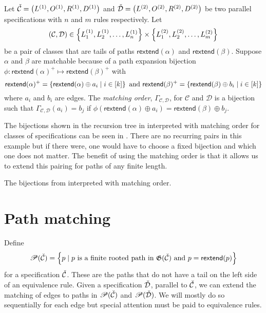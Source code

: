 \begin{definition}
Let $\check{\mathcal{C}} = \left(L^{(1)}, O^{(1)}, R^{(1)}, D^{(1)}\right)$ and $\check{\mathcal{D}} = \left(L^{(2)}, O^{(2)}, R^{(2)}, D^{(2)}\right)$ be two parallel specifications with $n$ and $m$ rules respectively. Let
\[
    \left(\mathcal{C},\mathcal{D}\right) \in \left\{L^{(1)}_1,L^{(1)}_2,\dotsc,L^{(1)}_n\right\} \times \left\{L^{(2)}_1, L^{(2)}_2, \dotsc, L^{(2)}_m\right\}
\]
be a pair of classes that are tails of paths $\textsf{rextend}(\alpha)$ and $\textsf{rextend}(\beta)$. Suppose $\alpha$ and $\beta$ are matchable because of a path expansion bijection $\phi: \textsf{rextend}(\alpha)^+ \mapsto \textsf{rextend}(\beta)^+$ with
\[
    \textsf{rextend}(\alpha)^+ = \left\{\textsf{rextend}(\alpha) \oplus a_i \mid i \in [k]\right\} \text{ and } \textsf{rextend}(\beta)^+ = \left\{\textsf{rextend}(\beta) \oplus b_i \mid i \in [k]\right\}
\]
where $a_i$ and $b_i$ are edges. The \emph{matching order}, $\Gamma_{\mathcal{C},\mathcal{D}}$, for $\mathcal{C}$ and $\mathcal{D}$ is a bijection such that $\Gamma_{\mathcal{C},\mathcal{D}}(a_i) = b_j$ if $\phi(\textsf{rextend}(\alpha) \oplus a_i) = \textsf{rextend}(\beta) \oplus b_j$.
\end{definition}

 The bijections shown in the recursion tree in  interpreted with matching order for classes of specifications can be seen in . There are no recurring pairs in this example but if there were, one would have to choose a fixed bijection and which one does not matter. The benefit of using the matching order is that it allows us to extend this pairing for paths of any finite length.

\begin{table}[ht!]
    \centering
    
    \caption{The bijections from  interpreted with matching order.}
    \label{tab:corrmatch}
\end{table}

\section{Path matching}
Define
\[
    \mathscr{P}(\check{\mathcal{C}}) = \left\{p \mid p \text{ is a finite rooted path in } \mathfrak{G}(\check{\mathcal{C}}) \text{ and }p = \textsf{rextend}(p)\right\}
\]
for a specification $\check{\mathcal{C}}$. These are the paths that do not have a tail on the left side of an equivalence rule. Given a specification $\check{\mathcal{D}}$, parallel to $\check{\mathcal{C}}$, we can extend the matching of edges to paths in $\mathscr{P}(\check{\mathcal{C}})$ and $\mathscr{P}(\check{\mathcal{D}})$. We will mostly do so sequentially for each edge but special attention must be paid to equivalence rules.


